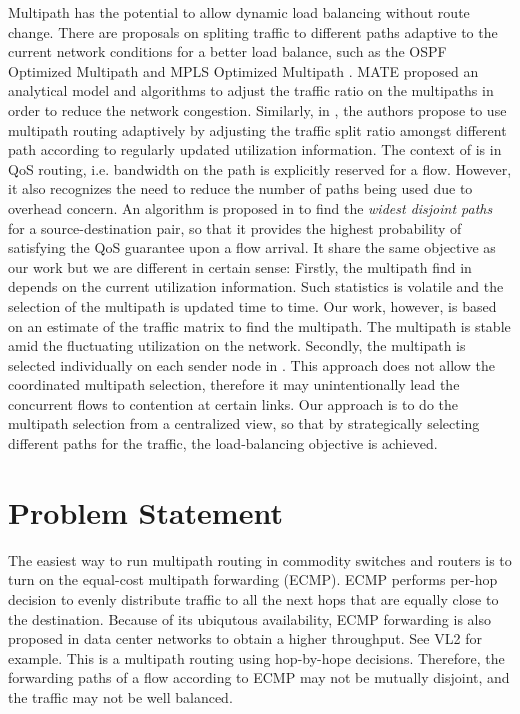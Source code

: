 \documentclass[conference]{IEEEtran}
\begin{document}
Multipath has the potential to allow dynamic load balancing without route
change. There are proposals on spliting traffic to different paths adaptive to
the current network conditions for a better load balance, such as the OSPF
Optimized Multipath \cite{ospfomp} and MPLS Optimized Multipath \cite{mplsomp}. 
MATE \cite{ejlw01} proposed an analytical model and algorithms to adjust the
traffic ratio on the multipaths in order to reduce the network congestion.
Similarly, in \cite{nzd04}, the authors propose to use multipath routing
adaptively by adjusting the traffic split ratio amongst different path
according to regularly updated utilization information. The context of
\cite{nzd04} is in QoS routing, i.e. bandwidth on the path is explicitly
reserved for a flow. However, it also recognizes the need to reduce the number
of paths being used due to overhead concern. An algorithm is proposed in
\cite{nzd04} to find the \emph{widest disjoint paths} for a source-destination
pair, so that it provides the highest probability of satisfying the QoS
guarantee upon a flow arrival. It share the same objective as our work but we
are different in certain sense: Firstly, the multipath find in \cite{nzd04}
depends on the current utilization information. Such statistics is volatile and
the selection of the multipath is updated time to time. Our work, however, is
based on an estimate of the traffic matrix to find the multipath. The multipath
is stable amid the fluctuating utilization on the network. Secondly, the
multipath is selected individually on each sender node in \cite{nzd04}. This
approach does not allow the coordinated multipath selection, therefore it may
unintentionally lead the concurrent flows to contention at certain links. Our
approach is to do the multipath selection from a centralized view, so that by
strategically selecting different paths for the traffic, the load-balancing
objective is achieved.

\section{Problem Statement}\label{sec:problem}

The easiest way to run multipath routing in commodity switches and routers is
to turn on the equal-cost multipath forwarding (ECMP). ECMP performs per-hop
decision to evenly distribute traffic to all the next hops that are equally
close to the destination. Because of its ubiqutous availability, ECMP
forwarding is also proposed in data center networks to obtain a higher
throughput. See VL2 \cite{gjkklmps09} for example. This is a multipath routing
using hop-by-hope decisions. Therefore, the forwarding paths of a flow
according to ECMP may not be mutually disjoint, and the traffic may not be well
balanced.
\end{document}
